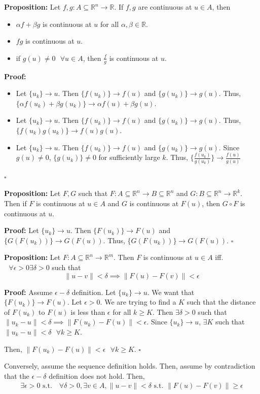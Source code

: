 \documentclass{article}
\newcommand*{\qed}{\hfill$\square$}%
\newcommand*{\txt}[1]{\text{ #1 }}%
\newcommand*{\fora}{\txt{}\forall}%
\newcommand*{\rr}{\mathbb{R}}%
\begin{document}
\textbf{Proposition:} Let $f,g: A\subseteq \rr^n\to \rr$. If $f,g$ are continuous at $u\in A$, then 
\begin{itemize}
    \item $\alpha f+\beta g$ is continuous at $u$ for all $\alpha,\beta\in \rr$.
    \item $fg$ is continuous at $u$.
    \item if $g(u)\neq 0\fora u\in A$, then $\frac{f}{g}$ is continuous at $u$.
\end{itemize}

\textbf{Proof:}\begin{itemize}
    \item Let $\{u_k\}\to u$. Then $\{f(u_k)\}\to f(u)$ and $\{g(u_k)\}\to g(u)$. Thus, $\{\alpha f(u_k)+\beta g(u_k)\}\to \alpha f(u)+\beta g(u)$.
    \item Let $\{u_k\}\to u$. Then $\{f(u_k)\}\to f(u)$ and $\{g(u_k)\}\to g(u)$. Thus, $\{f(u_k)g(u_k)\}\to f(u)g(u)$.
    \item Let $\{u_k\}\to u$. Then $\{f(u_k)\}\to f(u)$ and $\{g(u_k)\}\to g(u)$. Since $g(u)\neq 0$, $\{g(u_k)\}\neq 0$ for sufficiently large $k$. Thus, $\{\frac{f(u_k)}{g(u_k)}\}\to \frac{f(u)}{g(u)}$
\end{itemize}
\qed

\textbf{Proposition:} Let $F,G$ such that $F:A\subseteq \rr^n\to B\subseteq \rr^n$ and $G:B\subseteq \rr^n\to \rr^k$. Then if $F$ is continuous at $u\in A$ and $G$ is continuous at $F(u)$, then $G\circ F$ is continuous at $u$.

\textbf{Proof:} Let $\{u_k\}\to u$. Then $\{F(u_k)\}\to F(u)$ and $\{G(F(u_k))\}\to G(F(u))$. Thus, $\{G(F(u_k))\}\to G(F(u))$. \qed

\textbf{Proposition:} Let $F:A\subseteq \rr^n\to \rr^m$. Then $F$ is continuous at $u\in A$ iff. $\fora \epsilon>0 \exists \delta>0$ such that \[
    \|u-v\|<\delta\implies \|F(u)-F(v)\|<\epsilon
\]

\textbf{Proof:} Assume $\epsilon-\delta$ definition. Let $\{u_k\}\to u$. We want that $\{F(u_k)\}\to F(u)$. Let $\epsilon>0$. We are trying to find a $K$ such that the distance of $F(u_k)$ to $F(u)$ is less than $\epsilon$ for all $k\geq K$. Then $\exists \delta>0$ such that $\|u_k-u\|<\delta\implies \|F(u_k)-F(u)\|<\epsilon$. Since $\{u_k\}\to u$, $\exists K$ such that $\|u_k-u\|<\delta\fora k\geq K$. 

Then, $\|F(u_k)-F(u)\|<\epsilon\fora k\geq K$. \qed 

Conversely, assume the sequence definition holds. Then, assume by contradiction that the $\epsilon-\delta$ definition does not hold. Then, \begin{align*}
    \exists \epsilon>0 \txt{s.t.} \fora \delta>0, \exists v\in A, \|u-v\|<\delta \txt{s.t.} \|F(u)-F(v)\|\geq\epsilon
\end{align*}
\end{document}
